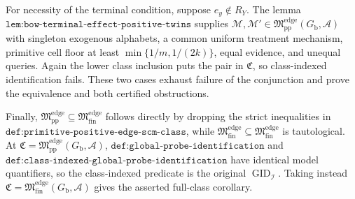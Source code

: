 For necessity of the terminal condition, suppose \(e_y\notin R_Y\).  The lemma \(\texttt{lem:bow-terminal-effect-positive-twins}\) supplies \(\mathcal M,\mathcal M'\in\mathfrak M_{\mathrm{pp}}^{\mathrm{edge}}(G_{\mathrm b},\mathcal A)\) with singleton exogenous alphabets, a common uniform treatment mechanism, primitive cell floor at least \(\min\{1/m,1/(2k)\}\), equal evidence, and unequal queries.  Again the lower class inclusion puts the pair in \(\mathfrak C\), so class-indexed identification fails.  These two cases exhaust failure of the conjunction and prove the equivalence and both certified obstructions.

Finally, \(\mathfrak M_{\mathrm{pp}}^{\mathrm{edge}}\subseteq\mathfrak M_{\mathrm{fin}}^{\mathrm{edge}}\) follows directly by dropping the strict inequalities in \(\texttt{def:primitive-positive-edge-scm-class}\), while \(\mathfrak M_{\mathrm{fin}}^{\mathrm{edge}}\subseteq\mathfrak M_{\mathrm{fin}}^{\mathrm{edge}}\) is tautological.  At \(\mathfrak C=\mathfrak M_{\mathrm{pp}}^{\mathrm{edge}}(G_{\mathrm b},\mathcal A)\), \(\texttt{def:global-probe-identification}\) and \(\texttt{def:class-indexed-global-probe-identification}\) have identical model quantifiers, so the class-indexed predicate is the original \(\operatorname{GID}_{\mathcal I}\).  Taking instead \(\mathfrak C=\mathfrak M_{\mathrm{fin}}^{\mathrm{edge}}(G_{\mathrm b},\mathcal A)\) gives the asserted full-class corollary.